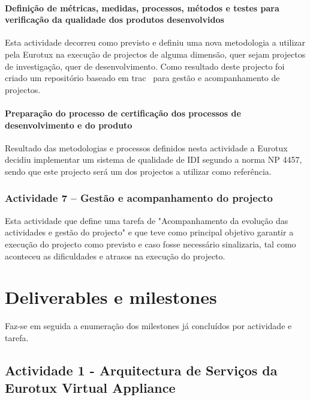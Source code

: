\documentclass[a4paper,12pt,portugues]{article}
\begin{document}
\paragraph{Definição de métricas, medidas, processos,  métodos e testes para verificação da qualidade dos produtos desenvolvidos}

Esta actividade decorreu como previsto e definiu uma nova metodologia a
utilizar pela Eurotux na execução de projectos de alguma dimensão, quer sejam
projectos de investigação, quer de desenvolvimento. Como resultado deste
projecto foi criado um repositório baseado em trac~\cite{trac} para gestão e
acompanhamento de projectos.


\paragraph{Preparação do processo de certificação dos processos de desenvolvimento e do produto}

Resultado das metodologias e processos definidos nesta actividade a Eurotux
decidiu implementar um sistema de qualidade de IDI segundo a norma NP 4457,
sendo que este projecto será um dos projectos a utilizar como referência.


\subsubsection{Actividade 7 – Gestão e acompanhamento do projecto}

Esta actividade que define uma tarefa de "Acompanhamento da evolução das
actividades e gestão do projecto" e que teve como principal objetivo garantir
a execução do projecto como previsto e caso fosse necessário sinalizaria, tal
como aconteceu as dificuldades e atrasos na execução do projecto.



\section{Deliverables e milestones} %
\label{sec:section_name}

Faz-se em seguida a enumeração dos milestones já concluídos por actividade e tarefa.

\subsection*{Actividade 1 - Arquitectura de Serviços da Eurotux Virtual Appliance} %
\label{sub:actividade_1}
\end{document}
